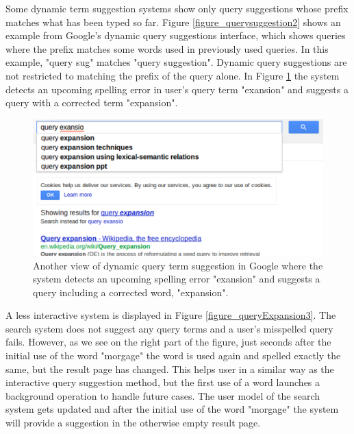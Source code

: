 \documentclass{sigchi}
\begin{document}
Some dynamic term suggestion systems show only query suggestions whose prefix matches what has been typed so far. Figure \ref{figure_querysuggestion2} shows an example from Google's dynamic query suggestions interface, which shows queries where the prefix matches some words used in previously used queries. In this example, "query sug" matches "query suggestion". Dynamic query suggestions are not restricted to matching the prefix of the query alone. In Figure \ref{figure_querysuggestion3} the system detects an upcoming spelling error in user's query term "exansion" and suggests a query with a corrected term "expansion". 
\begin{figure}[htp] %
\caption{Another view of dynamic query term suggestion in Google where the system detects an upcoming spelling error "exansion" and suggests a query including a corrected word, "expansion". \protect} \label{figure_querysuggestion3}
\includegraphics[scale=0.41]{figures/dynamicQueryTermSuggestion3.pdf} 
\end{figure}

A less interactive system is displayed in Figure \ref{figure_queryExpansion3}.
The search system does not suggest any query terms and a user's misspelled query fails.
However, as we see on the right part of the figure, just seconds after the initial use of the word "morgage" the word is used again and spelled exactly the same, but the result page has changed.
This helps user in a similar way as the interactive query suggestion method, but the first use of a word launches a background operation to handle future cases.
The user model of the search system gets updated and after the initial use of the word "morgage" the system will provide a suggestion in the otherwise empty result page.
\end{document}
